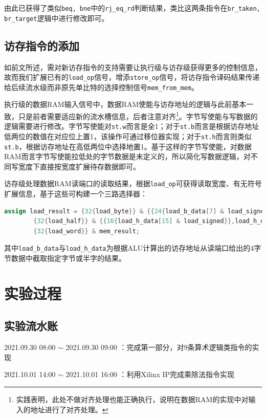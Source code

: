 \documentclass[UTF-8,twoside,c5size]{ctexart}
\begin{document}
	由此已获得了类似\texttt{beq, bne}中的\texttt{rj\_eq\_rd}判断结果，类比这两条指令在\texttt{br\_taken, br\_target}逻辑中进行修改即可。
	
	\subsection{访存指令的添加}
	
	如前文所述，需对新访存指令的支持需要让执行级与访存级获得更多的控制信息，故而我们扩展已有的\texttt{load\_op}信号，增添\texttt{store\_op}信号，将访存指令译码结果传递给后续流水级而非原先单比特的选择控制信号\texttt{mem\_from\_mem}。
	
	执行级的数据RAM输入信号中，数据RAM使能与访存地址的逻辑与此前基本一致，只是前者需要适应新的流水槽信息，后者注意对齐\footnote{实践表明，此处不做对齐处理也能正确执行，说明在数据RAM的实现中对输入的地址进行了对齐处理。}。字节写使能与写数据的逻辑需要进行修改。字节写使能对\texttt{st.w}而言是全1；对于\texttt{st.b}而言是根据访存地址低两位的数值在对应位上置1，该操作可通过移位器实现；对于\texttt{st.h}而言则类似\texttt{st.b}，根据访存地址在高低两位中选择地置1。基于这样的字节写使能，对数据RAM而言字节写使能拉低处的字节数据是未定义的，所以简化写数据逻辑，对不同写宽度下直接按宽度扩展待存数据即可。
	
	访存级处理数据RAM读端口的读取结果，根据\texttt{load\_op}可获得读取宽度、有无符号扩展信息，基于这些可构建一个三路选择器：
	\begin{lstlisting}[language=verilog]
assign load_result = {32{load_byte}} & {{24{load_b_data[7] & load_signed}},load_b_data} |
		{32{load_half}} & {{16{load_h_data[15] & load_signed}},load_h_data} |
		{32{load_word}} & mem_result;
	\end{lstlisting}
	其中\texttt{load\_b\_data}与\texttt{load\_h\_data}为根据ALU计算出的访存地址从读端口给出的4字节数据中截取指定字节或半字的结果。
	
	\section{实验过程}
	
	\subsection{实验流水账}
	
	2021.09.30 08:00 $\sim$ 2021.09.30 09:00 ：完成第一部分，对9条算术逻辑类指令的实现
	
	2021.10.01 14:00 $\sim$ 2021.10.01 16:00 ：利用Xilinx IP完成乘除法指令实现
	
\end{document}
